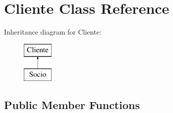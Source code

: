 \hypertarget{class_cliente}{}\section{Cliente Class Reference}
\label{class_cliente}
Inheritance diagram for Cliente\+:\begin{figure}[H]
\begin{center}
\leavevmode
\includegraphics[height=2.000000cm]{class_cliente}
\end{center}
\end{figure}
\subsection*{Public Member Functions}
